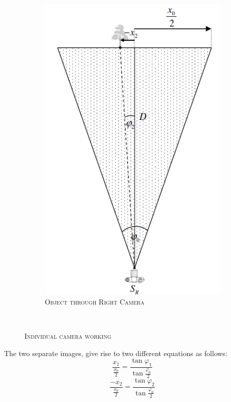 \begin{figure}[h]
\begin{subfigure}[b]{0.4\textwidth}
		\includegraphics[width=1.3\textwidth]{project/images/r.png}
		\caption{\textsc{Object through Right Camera}}
		\label{fig:4}
	\end{subfigure}\\
	\caption{\textsc{Individual camera working}}
\end{figure}
The two separate images, give rise to two different equations as follows:
\begin{equation}
\frac{x_{1}}{\frac{x_{0}}{2}}=\frac{\tan\varphi_{1}}{\tan\frac{\varphi_{0}}{2}}
\end{equation}
\begin{equation}
\frac{-x_{2}}{\frac{x_{0}}{2}}=\frac{\tan\varphi_{2}}{\tan\frac{\varphi_{0}}{2}}
\end{equation}
